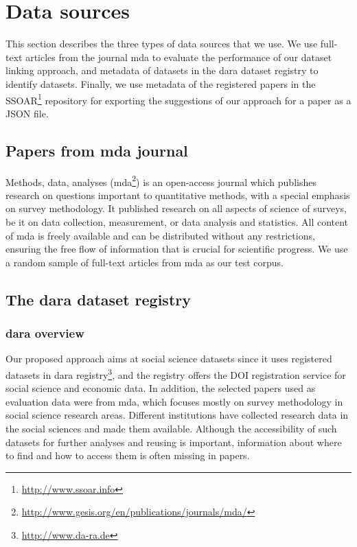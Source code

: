 \documentclass{IOS-Book-Article}
\newcommand{\dara}{\textsf{da\textbar ra}}
\begin{document}
\section{Data sources}
\label{sec:data}
This section describes the three types of data sources that we use. We use full-text articles from the journal mda to evaluate the performance of our dataset linking approach, and metadata of datasets in the {\dara} dataset registry to identify datasets. 
Finally, we use metadata of the registered papers in the SSOAR\footnote{\url{http://www.ssoar.info}} repository for exporting the suggestions of our approach for a paper as a JSON file.
 
 \subsection{Papers from mda journal}\label{sec:mda}
 
 Methods, data, analyses (mda\footnote{\url{http://www.gesis.org/en/publications/journals/mda/}}) is an open-access journal which publishes research on questions important to quantitative methods, with a special emphasis on survey methodology. It published research on all aspects of science of surveys, be it on data collection, measurement, or data analysis and statistics. All content of mda is freely available and can be distributed without any restrictions, ensuring the free flow of information that is crucial for scientific progress. We use a random sample of full-text articles from mda as our test corpus.
  \subsection{The {\dara} dataset registry}
  
  \subsubsection{{\dara} overview}
Our proposed approach aims at social science datasets since it uses registered datasets in {\dara} registry\footnote{\url{http://www.da-ra.de}}, and the registry offers the DOI registration service for social science and economic data. 
In addition, the selected papers used as evaluation data were from mda, which focuses mostly on survey methodology in social science research areas. 
Different institutions have collected research data in the social sciences and made them available. Although the accessibility of such datasets for further analyses and reusing is important, information about where to find and how to access them is often missing in papers.
\end{document}
